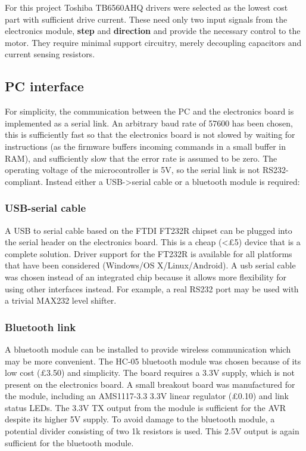 For this project Toshiba TB6560AHQ drivers were selected as the lowest
cost part with sufficient drive current. These need only two input
signals from the electronics module, \textbf{step} and \textbf{direction}
and provide the necessary control to the motor. They require minimal 
support circuitry, merely decoupling capacitors and current sensing resistors.

\subsection{PC interface}
For simplicity, the communication between the PC and the electronics board is implemented as a serial link. An arbitrary baud rate of 57600 has been
chosen, this is sufficiently fast so that the electronics board is not slowed by waiting for instructions (as the firmware buffers incoming commands in
a small buffer in RAM), and sufficiently slow that the error rate is assumed to be zero. The operating voltage of the microcontroller is 5V, so the
serial link is not RS232-compliant. Instead either a USB-\textgreater serial cable or a bluetooth module is required:

\subsubsection{USB-serial cable}
A USB to serial cable based on the FTDI FT232R chipset can be plugged into the serial header on the electronics board. This is a cheap (\textless \pounds 5) device that is 
a complete solution. Driver support for the FT232R is available for all platforms that have been considered (Windows/OS X/Linux/Android). A usb serial cable
was chosen instead of an integrated chip because it allows more flexibility for using other interfaces instead. For example, a real RS232 port may be used with a trivial
MAX232 level shifter.

\subsubsection{Bluetooth link}
A bluetooth module can be installed to provide wireless communication which may be more convenient. The HC-05 bluetooth module was
chosen because of its low cost (\pounds 3.50) and simplicity. The board requires a 3.3V supply, which is not present on the electronics board. A small
breakout board was manufactured for the module, including an AMS1117-3.3 3.3V linear regulator (\pounds 0.10) and link status LEDs. The 3.3V TX output from the module is sufficient
for the AVR despite its higher 5V supply. To avoid damage to the bluetooth module, a potential divider consisting of two 1k resistors is used. This 2.5V output is
again sufficient for the bluetooth module.

